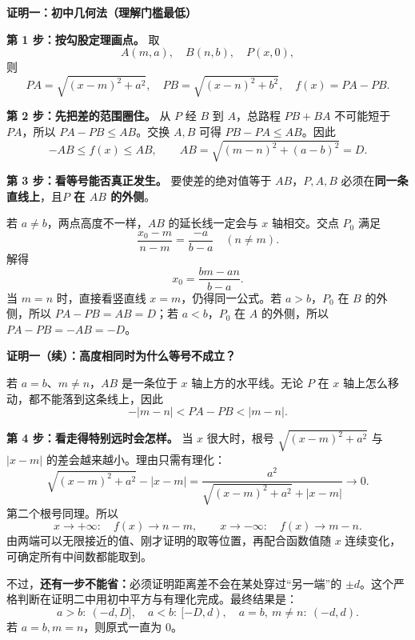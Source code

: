 \clearpage
\begin{proofbox}
\textbf{\textcolor{CProof}{证明一：初中几何法（理解门槛最低）}}



\textbf{第 1 步：按勾股定理画点。} 取
\[
 A(m,a),\quad B(n,b),\quad P(x,0),
\]
则
\[
 PA=\sqrt{(x-m)^2+a^2},\quad
 PB=\sqrt{(x-n)^2+b^2},\quad
 f(x)=PA-PB.
\]

\textbf{第 2 步：先把差的范围圈住。} 从 $P$ 经 $B$ 到 $A$，总路程 $PB+BA$ 不可能短于 $PA$，所以 $PA-PB\leq AB$。交换 $A,B$ 可得 $PB-PA\leq AB$。因此
\[
 \boxed{-AB\leq f(x)\leq AB},\qquad
 AB=\sqrt{(m-n)^2+(a-b)^2}=D.
\]
\end{proofbox}
\clearpage
\begin{proofbox}
\textbf{第 3 步：看等号能否真正发生。} 要使差的绝对值等于 $AB$，$P,A,B$ 必须在\textbf{同一条直线上}，且\textbf{$P$ 在 $AB$ 的外侧}。



若 $a\ne b$，两点高度不一样，$AB$ 的延长线一定会与 $x$ 轴相交。交点 $P_0$ 满足
\[
 \frac{x_0-m}{n-m}=\frac{-a}{b-a}\quad(n\ne m).
\]
解得
\[
 \boxed{x_0=\frac{bm-an}{b-a}}.
\]
当 $m=n$ 时，直接看竖直线 $x=m$，仍得同一公式。若 $a>b$，$P_0$ 在 $B$ 的外侧，所以 $PA-PB=AB=D$；若 $a<b$，$P_0$ 在 $A$ 的外侧，所以 $PA-PB=-AB=-D$。

\end{proofbox}
\clearpage
\begin{proofbox}
\textbf{\textcolor{CProof}{证明一（续）：高度相同时为什么等号不成立？}}

若 $a=b$、$m\ne n$，$AB$ 是一条位于 $x$ 轴上方的水平线。无论 $P$ 在 $x$ 轴上怎么移动，都不能落到这条线上，因此
\[
 -|m-n|<PA-PB<|m-n|.
\]


\textbf{第 4 步：看走得特别远时会怎样。} 当 $x$ 很大时，根号 $\sqrt{(x-m)^2+a^2}$ 与 $|x-m|$ 的差会越来越小。理由只需有理化：
\[
 \sqrt{(x-m)^2+a^2}-|x-m|
 =\frac{a^2}{\sqrt{(x-m)^2+a^2}+|x-m|}\longrightarrow0.
\]
第二个根号同理。所以
\[
 x\to+\infty:\quad f(x)\to n-m,\qquad
 x\to-\infty:\quad f(x)\to m-n.
\]
由两端可以无限接近的值、刚才证明的取等位置，再配合函数值随 $x$ 连续变化，可确定所有中间数都能取到。

不过，\textbf{还有一步不能省：}必须证明距离差不会在某处穿过“另一端”的 $\pm d$。这个严格判断在证明二中用初中平方与有理化完成。最终结果是：
\[
 a>b:\ (-d,D],\quad a<b:\ [-D,d),\quad
 a=b,\ m\ne n:\ (-d,d).
\]
若 $a=b,m=n$，则原式一直为 $0$。
\end{proofbox}
\clearpage
